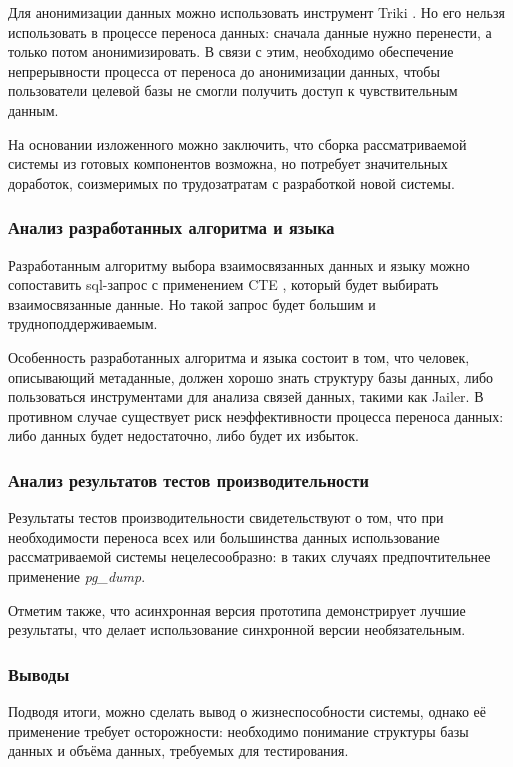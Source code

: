 Для анонимизации данных можно использовать инструмент Triki \cite{triki}. Но его нельзя использовать в процессе переноса данных: сначала данные нужно перенести, а только потом анонимизировать. В связи с этим, необходимо обеспечение непрерывности процесса от переноса до анонимизации данных, чтобы пользователи целевой базы не смогли получить доступ к чувствительным данным.

На основании изложенного можно заключить, что сборка рассматриваемой системы из готовых компонентов возможна, но потребует значительных доработок, соизмеримых по трудозатратам с разработкой новой системы.

\subsubsection{Анализ разработанных алгоритма и языка}

Разработанным алгоритму выбора взаимосвязанных данных и языку можно сопоставить sql-запрос с применением CTE \cite{pg-cte}, который будет выбирать взаимосвязанные данные. Но такой запрос будет большим и трудноподдерживаемым.

Особенность разработанных алгоритма и языка состоит в том, что человек, описывающий метаданные, должен хорошо знать структуру базы данных, либо пользоваться инструментами для анализа связей данных, такими как Jailer. В противном случае существует риск неэффективности процесса переноса данных: либо данных будет недостаточно, либо будет их избыток.

\subsubsection{Анализ результатов тестов производительности}

Результаты тестов производительности свидетельствуют о том, что при необходимости переноса всех или большинства данных использование рассматриваемой системы нецелесообразно: в таких случаях предпочтительнее применение \textit{pg\_dump}.

Отметим также, что асинхронная версия прототипа демонстрирует лучшие результаты, что делает использование синхронной версии необязательным.

\subsubsection{Выводы}

Подводя итоги, можно сделать вывод о жизнеспособности системы, однако её применение требует осторожности: необходимо понимание структуры базы данных и объёма данных, требуемых для тестирования.
